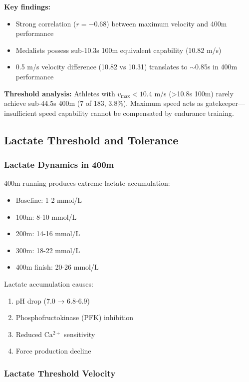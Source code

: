 \textbf{Key findings:}
\begin{itemize}
    \item Strong correlation ($r = -0.68$) between maximum velocity and 400m performance
    \item Medalists possess sub-10.3s 100m equivalent capability (10.82 m/s)
    \item 0.5 m/s velocity difference (10.82 vs 10.31) translates to $\sim$0.85s in 400m performance
\end{itemize}

\textbf{Threshold analysis:} Athletes with $v_{\max} < 10.4$ m/s (>10.8s 100m) rarely achieve sub-44.5s 400m (7 of 183, 3.8\%). Maximum speed acts as gatekeeper—insufficient speed capability cannot be compensated by endurance training.

\subsection{Lactate Threshold and Tolerance}

\subsubsection{Lactate Dynamics in 400m}

400m running produces extreme lactate accumulation:
\begin{itemize}
    \item Baseline: 1-2 mmol/L
    \item 100m: 8-10 mmol/L
    \item 200m: 14-16 mmol/L
    \item 300m: 18-22 mmol/L
    \item 400m finish: 20-26 mmol/L
\end{itemize}

Lactate accumulation causes:
\begin{enumerate}
    \item pH drop (7.0 → 6.8-6.9)
    \item Phosphofructokinase (PFK) inhibition
    \item Reduced Ca$^{2+}$ sensitivity
    \item Force production decline
\end{enumerate}

\subsubsection{Lactate Threshold Velocity}

